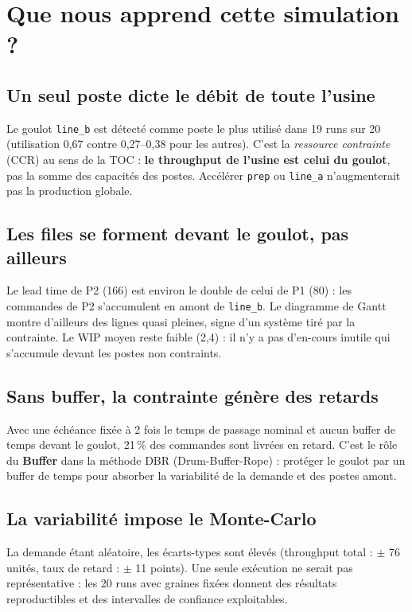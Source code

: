 \documentclass[11pt,a4paper]{article}
\begin{document}
\section{Que nous apprend cette simulation ?}

\subsection{Un seul poste dicte le débit de toute l'usine}
Le goulot \texttt{line\_b} est détecté comme poste le plus utilisé dans
19 runs sur 20 (utilisation 0,67 contre 0,27--0,38 pour les autres). C'est la
\emph{ressource contrainte} (CCR) au sens de la TOC : \textbf{le throughput de
l'usine est celui du goulot}, pas la somme des capacités des postes. Accélérer
\texttt{prep} ou \texttt{line\_a} n'augmenterait pas la production globale.

\subsection{Les files se forment devant le goulot, pas ailleurs}
Le lead time de P2 (166) est environ le double de celui de P1 (80) : les
commandes de P2 s'accumulent en amont de \texttt{line\_b}. Le diagramme de
Gantt montre d'ailleurs des lignes quasi pleines, signe d'un système tiré par
la contrainte. Le WIP moyen reste faible (2,4) : il n'y a pas d'en-cours
inutile qui s'accumule devant les postes non contraints.

\subsection{Sans buffer, la contrainte génère des retards}
Avec une échéance fixée à 2 fois le temps de passage nominal et aucun buffer
de temps devant le goulot, 21\,\% des commandes sont livrées en retard. C'est
le rôle du \textbf{Buffer} dans la méthode DBR (Drum-Buffer-Rope) : protéger le
goulot par un buffer de temps pour absorber la variabilité de la demande et
des postes amont.

\subsection{La variabilité impose le Monte-Carlo}
La demande étant aléatoire, les écarts-types sont élevés (throughput total :
$\pm$ 76 unités, taux de retard : $\pm$ 11 points). Une seule exécution ne
serait pas représentative : les 20 runs avec graines fixées donnent des
résultats reproductibles et des intervalles de confiance exploitables.
\end{document}
